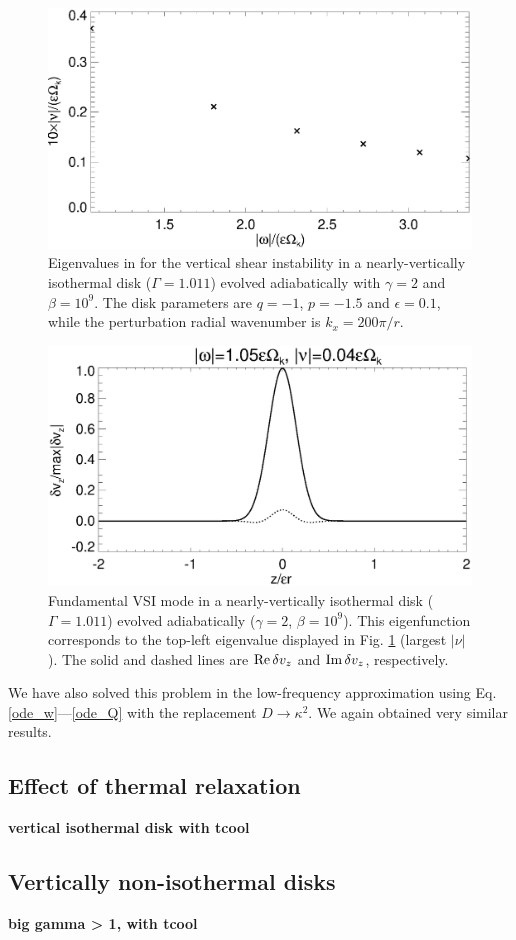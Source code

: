 \begin{figure}
  \includegraphics[width=\linewidth]{figures/eigenvalues_adia}
  \caption{Eigenvalues in for the
    vertical shear instability in a nearly-vertically isothermal disk
    ($\Gamma=1.011$) evolved adiabatically with $\gamma=2$ and
    $\beta=10^9$. The disk
    parameters are $q=-1$, 
    $p=-1.5$ and $\epsilon=0.1$, while the perturbation radial
    wavenumber is $k_x=200\pi/r$. \label{lowfreq_eigen_adia}
  }
\end{figure}
  

\begin{figure}
  \includegraphics[width=\linewidth]{figures/eigenvectorvz_adia}
  \caption{Fundamental VSI mode in a nearly-vertically
    isothermal disk ($\Gamma=1.011$) evolved adiabatically
    ($\gamma=2$, $\beta=10^9$). This eigenfunction 
    corresponds to the top-left eigenvalue displayed in 
    Fig. \ref{lowfreq_eigen_adia} (largest $|\nu|$).  
    The solid and dashed lines are $\operatorname{Re} \delta v_z$ and $\operatorname{Im}
    \delta v_z$, respectively.  
    \label{lowfreq_eigenfunc_adia}
  }
\end{figure}


We have also solved this problem in the low-frequency approximation
using Eq. \ref{ode_w}---\ref{ode_Q} with the replacement
$D\to\kappa^2$. We again obtained very similar results. 

\subsection{Effect of thermal relaxation}
{\bf vertical isothermal disk with tcool}

\subsection{Vertically non-isothermal disks}
{\bf big gamma > 1, with tcool} 